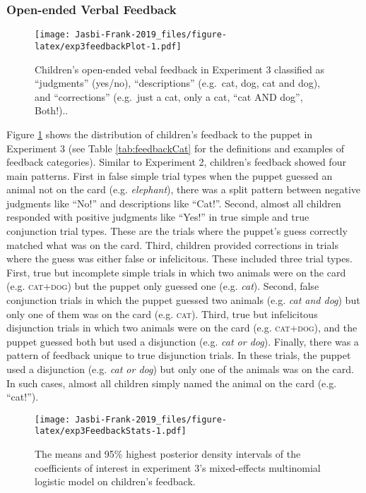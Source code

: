 \documentclass[,man,floatsintext]{apa6}
\begin{document}
\hypertarget{open-ended-verbal-feedback-1}{%
\subsubsection{Open-ended Verbal Feedback}\label{open-ended-verbal-feedback-1}}

\begin{figure}
\centering
\texttt{[image: Jasbi-Frank-2019\_files/figure-latex/exp3feedbackPlot-1.pdf]}
\caption{\label{fig:exp3feedbackPlot}Children's open-ended vebal feedback in Experiment 3 classified as \enquote{judgments} (yes/no), \enquote{descriptions} (e.g.~cat, dog, cat and dog), and \enquote{corrections} (e.g.~just a cat, only a cat, \enquote{cat AND dog}, Both!)..}
\end{figure}

Figure \ref{fig:exp3feedbackPlot} shows the distribution of children's feedback to the puppet in Experiment 3 (see Table \ref{tab:feedbackCat} for the definitions and examples of feedback categories). Similar to Experiment 2, children's feedback showed four main patterns. First in false simple trial types when the puppet guessed an animal not on the card (e.g. \emph{elephant}), there was a split pattern between negative judgments like \enquote{No!} and descriptions like \enquote{Cat!}. Second, almost all children responded with positive judgments like \enquote{Yes!} in true simple and true conjunction trial types. These are the trials where the puppet's guess correctly matched what was on the card. Third, children provided corrections in trials where the guess was either false or infelicitous. These included three trial types. First, true but incomplete simple trials in which two animals were on the card (e.g. \textsc{cat+dog}) but the puppet only guessed one (e.g. \emph{cat}). Second, false conjunction trials in which the puppet guessed two animals (e.g. \emph{cat and dog}) but only one of them was on the card (e.g. \textsc{cat}). Third, true but infelicitous disjunction trials in which two animals were on the card (e.g. \textsc{cat+dog}), and the puppet guessed both but used a disjunction (e.g. \emph{cat or dog}). Finally, there was a pattern of feedback unique to true disjunction trials. In these trials, the puppet used a disjunction (e.g. \emph{cat or dog}) but only one of the animals was on the card. In such cases, almost all children simply named the animal on the card (e.g. \enquote{cat!}).

\begin{figure}
\centering
\texttt{[image: Jasbi-Frank-2019\_files/figure-latex/exp3FeedbackStats-1.pdf]}
\caption{\label{fig:exp3FeedbackStats}The means and 95\% highest posterior density intervals of the coefficients of interest in experiment 3's mixed-effects multinomial logistic model on children's feedback.}
\end{figure}
\end{document}
